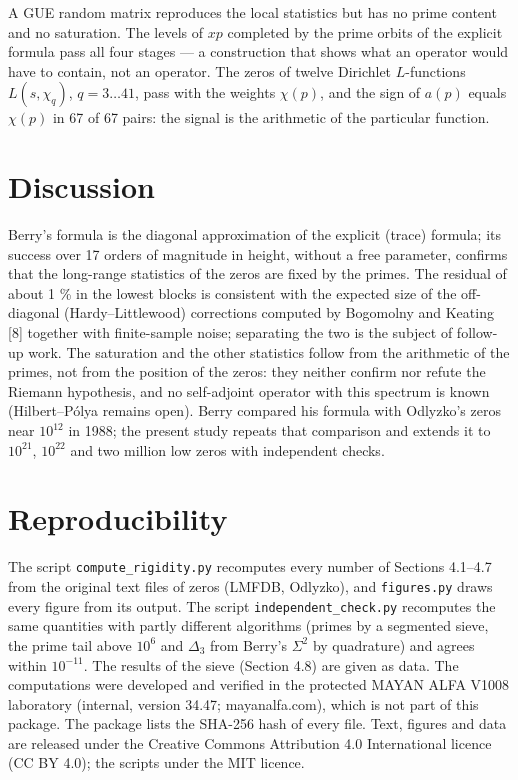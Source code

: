 \documentclass[11pt]{article}
\begin{document}
A GUE random matrix reproduces the local statistics but has no prime
content and no saturation. The levels of \(xp\) completed by the prime
orbits of the explicit formula pass all four stages --- a construction
that shows what an operator would have to contain, not an operator. The
zeros of twelve Dirichlet \(L\)-functions \(L(s, \chi_q)\),
\(q = 3 \dots 41\), pass with the weights \(\chi(p)\), and the sign of
\(a(p)\) equals \(\chi(p)\) in 67 of 67 pairs: the signal is the
arithmetic of the particular function.

\hypertarget{discussion}{%
\section{Discussion}\label{discussion}}

Berry's formula is the diagonal approximation of the explicit (trace)
formula; its success over 17 orders of magnitude in height, without a
free parameter, confirms that the long-range statistics of the zeros are
fixed by the primes. The residual of about 1 \% in the lowest blocks is
consistent with the expected size of the off-diagonal
(Hardy--Littlewood) corrections computed by Bogomolny and Keating
{[}8{]} together with finite-sample noise; separating the two is the
subject of follow-up work. The saturation and the other statistics
follow from the arithmetic of the primes, not from the position of the
zeros: they neither confirm nor refute the Riemann hypothesis, and no
self-adjoint operator with this spectrum is known (Hilbert--Pólya
remains open). Berry compared his formula with Odlyzko's zeros near
\(10^{12}\) in 1988; the present study repeats that comparison and
extends it to \(10^{21}\), \(10^{22}\) and two million low zeros with
independent checks.

\hypertarget{reproducibility}{%
\section{Reproducibility}\label{reproducibility}}

The script \texttt{compute\_rigidity.py} recomputes every number of
Sections 4.1--4.7 from the original text files of zeros (LMFDB,
Odlyzko), and \texttt{figures.py} draws every figure from its output.
The script \texttt{independent\_check.py} recomputes the same quantities
with partly different algorithms (primes by a segmented sieve, the prime
tail above \(10^6\) and \(\Delta_3\) from Berry's \(\Sigma^2\) by
quadrature) and agrees within \(10^{-11}\). The results of the sieve
(Section 4.8) are given as data. The computations were developed and
verified in the protected MAYAN ALFA V1008 laboratory (internal, version
34.47; mayanalfa.com), which is not part of this package. The package
lists the SHA-256 hash of every file. Text, figures and data are
released under the Creative Commons Attribution 4.0 International
licence (CC BY 4.0); the scripts under the MIT licence.
\end{document}
